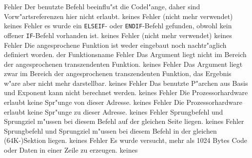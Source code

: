 \documentclass[12pt,a4paper,twoside]{report}
\newcommand{\tty}[1]{{\tt #1}}
\begin{document}
\begin{description}
               {Fehler}
               {Der benutzte Befehl beeinflu"st die Codel"ange,
                daher sind Vorw"artsreferenzen hier nicht erlaubt.}
               {keines}
               {Fehler}
               {(nicht mehr verwendet)}
               {keines}
               {Fehler}
               {es wurde ein \tty{ELSEIF}- oder \tty{ENDIF}-Befehl gefunden,
                obwohl kein offener \tty{IF}-Befehl vorhanden ist.}
               {keines}
               {Fehler}
               {(nicht mehr verwendet)}
               {keines}
               {Fehler}
               {Die angesprochene Funktion ist weder eingebaut
                noch nachtr"aglich definiert worden.}
               {der Funktionsname}
               {Fehler}
               {Das Argument liegt nicht im Bereich der
                angesprochenen transzendenten Funktion.}
               {keines}
               {Fehler}
               {Das Argument liegt zwar im Bereich der
                angesprochenen transzendenten Funktion, das Ergebnis
                w"are aber nicht mehr darstellbar.}
               {keines}
               {Fehler}
               {Das benutzte P"archen aus Basis und Exponent
                kann nicht berechnet werden.}
               {keines}
               {Fehler}
               {Die Prozessorhardware erlaubt keine
                Spr"unge von dieser Adresse.}
               {keines}
               {Fehler}
               {Die Prozessorhardware erlaubt keine
                Spr"unge zu dieser Adresse.}
               {keines}
               {Fehler}
               {Sprungbefehl und Sprungziel m"ussen bei diesem
                Befehl auf der gleichen Seite liegen.}
               {keines}
               {Fehler}
               {Sprungbefehl und Sprungziel m"ussen bei diesem
                Befehl in der gleichen (64K-)Sektion liegen.}
               {keines}
               {Fehler}
               {Es wurde versucht, mehr als 1024 Bytes Code oder
                Daten in einer Zeile zu erzeugen.}
               {keines}

\end{description}
\end{document}
